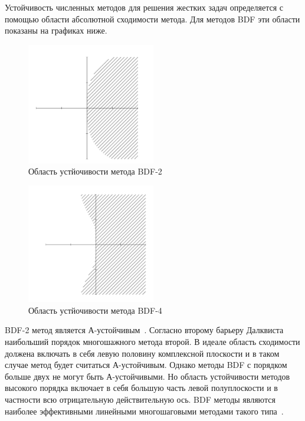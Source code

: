 \documentclass[12pt, a4paper]{article}
\begin{document}
Устойчивость численных методов для решения жестких задач определяется с помощью области абсолютной сходимости метода. Для методов BDF эти области показаны на графиках ниже.

\begin{figure}[!h]
	\centering
	\includegraphics[width=0.5\textwidth]{lin-stab-bdf-2}%
	\caption{Область устйочивости метода BDF-2}
	\vspace*{-2mm}
	\label{ser_graph}
\end{figure}

\begin{figure}[!h]
	\centering
	\includegraphics[width=0.5\textwidth]{lin-stab-bdf-4}%
	\caption{Область устйочивости метода BDF-4}
	\vspace*{-2mm}
	\label{ser_graph}
\end{figure}

BDF-2 метод является А-устойчивым~\cite{cambridge}.
Согласно второму барьеру Далквиста наибольший порядок многошажного метода второй.
В идеале область сходимости должена включать в себя левую половину комплексной плоскости и в таком случае метод будет считаться А-устойчивым. Однако методы BDF с порядком больше двух не могут быть А-устойчивыми. Но область устойчивости методов высокого порядка включает в себя большую часть левой полуплоскости и в частности всю отрицательную действительную ось. BDF методы являются наиболее эффективными линейными многошаговыми методами такого типа~\cite{cambridge}.
\end{document}
